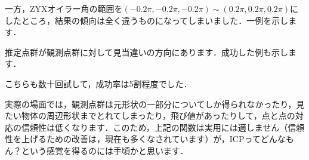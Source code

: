 ﻿\documentclass[a4paper]{jsarticle}
\begin{document}
一方，ZYXオイラー角の範囲を$(-0.2\pi,-0.2\pi,-0.2\pi)\sim(0.2\pi,0.2\pi,0.2\pi)$にしたところ，結果の傾向は全く違うものになってしまいました．一例を示します．

推定点群が観測点群に対して見当違いの方向にあります．成功した例も示します．


こちらも数十回試して，成功率は5割程度でした．

実際の場面では，観測点群は元形状の一部分についてしか得られなかったり，見たい物体の周辺形状までとれてしまったり，飛び値があったりして，点と点の対応の信頼性は低くなります．このため，上記の関数は実用には適しません（信頼性を上げるための改善は，現在も多くなされています）が，ICPってどんなもん？という感覚を得るのには手頃かと思います．
\end{document}
